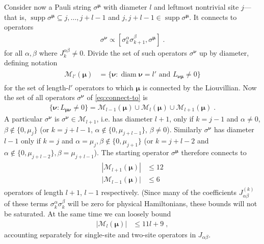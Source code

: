 \documentclass[aps,prb,nofootinbib,twocolumn,balancelastpage,amsmath,amssymb,floatfix,superscriptaddress,]{revtex4-1}
\DeclareMathOperator{\supp}{supp}
\DeclareMathOperator{\diam}{diam}
\begin{document}
Consider now a Pauli string $\sigma^{\bm \mu} $ with diameter $l$ and leftmost nontrivial site $j$---that is, $\supp \sigma^{\bm \mu} \subseteq j, \dots, j+l-1$ and $j, j+l-1 \in \supp \sigma^{\bm \mu}$.
It connects to operators
\begin{align}
  \label{eq:connect-to}
 \sigma^{\bm \nu} \propto [\sigma^\alpha_{k}\sigma^{\beta}_{k+1}, \sigma^{\bm \mu} ]\;.
\end{align}
for all $\alpha,\beta$ where $J^{\alpha\beta}_k \ne 0$.
Divide the set of such operators $\sigma^{\bm \nu}$ up by diameter,
defining notation
\begin{align}
  \begin{split}
    \mathcal M_{l'}(\bm \mu)
    &= \{
    \bm \nu : \text{$\diam \bm \nu = l'$ and $L_{\bm \nu\bm \mu} \ne 0$}
    \}
  \end{split}
\end{align}
for the set of length-$l'$ operators to which $\bm \mu$ is connected by the Liouvillian.
Now the set of all operators $\sigma^{\bm \nu}$ of \eqref{eq:connect-to} is
\begin{align}
  \{ \bm \nu : L_{\bm \mu \bm \nu} \ne 0\} = \mathcal M_{l-1}(\bm\mu) \cup \mathcal M_{l}(\bm\mu) \cup \mathcal M_{l+1}(\bm\mu)\;.
\end{align}
A particular $\sigma^{\bm \nu}$ is $\sigma^{\bm \nu} \in \mathcal M_{l+1}$,
i.e. has diameter $l+1$, only if
$k = j-1$ and $\alpha \ne 0$, $\beta \not\in \{ 0,\mu_j\}$
(or $k = j + l - 1$, $\alpha \not\in\{0,\mu_{j+l-1}\}$, $\beta \ne 0$).
Similarly
$\sigma^{\bm \nu}$ has diameter $l-1$ only if
$k = j$ and $\alpha = \mu_j, \beta \not\in\{0,\mu_{j+1}\}$
(or $k = j+l-2$ and $\alpha \not\in\{0,\mu_{j+l-2}\}, \beta = \mu_{j+l-1}$).
The starting operator $\sigma^{\bm \mu}$ therefore connects to 
\begin{align}
  \label{eq:interpool-bound}
  \begin{split}
    |\mathcal M_{l+1}(\bm \mu)| &\le 12\\
    |\mathcal M_{l-1}(\bm \mu)| &\le 6
  \end{split}
\end{align}
operators of length $l+1$, $l-1$ respectively.
(Since many of the coefficients $J^{(k)}_{\alpha\beta}$ of these terms $\sigma^{\alpha}_k\sigma^{\beta}_k$ will be zero for physical Hamiltonians, these bounds will not be saturated.
At the same time we can loosely bound
\begin{align}
  \label{eq:intrapool-bound}
    |\mathcal M_{l}(\bm \mu)| &\le 11 l + 9\;,
\end{align}
accounting separately for single-site and two-site operators in $J_{\alpha\beta}$.
\end{document}
